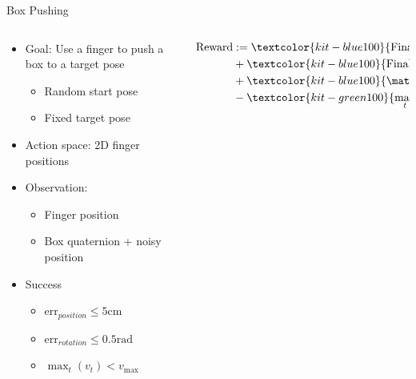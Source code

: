 \documentclass[16:9,en,navbarinfooter]{sdqbeamer}
\begin{document}
\begin{frame}{Box Pushing}

	\begin{columns}[t]
		\begin{column}{0.4\textwidth}
			\vspace{1cm}
			\begin{itemize}
				\item Goal: Use a finger to push a box to a target pose
				      \begin{itemize}
					      \item Random start pose
					      \item Fixed target pose
				      \end{itemize}
				\item Action space: 2D finger positions
				\item Observation:
				      \begin{itemize}
					      \item Finger position
					      \item Box quaternion + noisy position
				      \end{itemize}
				\item Success
				      \begin{itemize}
					      \item $\text{err}_{position} \leq 5 \text{cm}$
					      \item $\text{err}_{rotation} \leq 0.5 \text{rad}$
					      \item $\max_t(v_t) < v_\text{max}$
				      \end{itemize}
			\end{itemize}
			\vspace{1em}
		\end{column}
		\begin{column}{0.5\textwidth}
			\vspace{.5cm}
			\[
				\begin{aligned}
					\text{Reward} & := \textcolor{kit-blue100}{\text{Final Euclidean Distance}}                         \\
					              & +  \textcolor{kit-blue100}{\text{Final Rotational Distance}}                        \\
					              & +  \textcolor{kit-blue100}{\mathds{1} \left\{\text{success}\right\} }               \\
					              & -  \textcolor{kit-green100}{\max_t\  \text{step}(v_t)}                              \\

\end{aligned}\]
\end{column}
\end{columns}
\end{frame}
\end{document}
